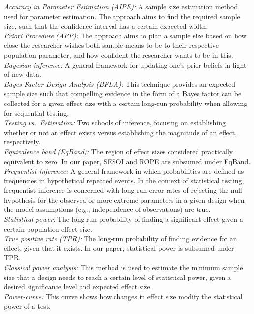 \documentclass[
  english,
  man,floatsintext]{apa6}
\begin{document}
\emph{Accuracy in Parameter Estimation (AIPE):} A sample size estimation method used for parameter estimation. The approach aims to find the required sample size, such that the confidence interval has a certain expected width.\\
\emph{Priori Procedure (APP):} The approach aims to plan a sample size based on how close the researcher wishes both sample means to be to their respective population parameter, and how confident the researcher wants to be in this.\\
\emph{Bayesian inference:} A general framework for updating one's prior beliefs in light of new data.\\
\emph{Bayes Factor Design Analysis (BFDA):} This technique provides an expected sample size such that compelling evidence in the form of a Bayes factor can be collected for a given effect size with a certain long-run probability when allowing for sequential testing.\\
\emph{Testing vs.~Estimation:} Two schools of inference, focusing on establishing whether or not an effect exists versus establishing the magnitude of an effect, respectively.\\
\emph{Equivalence band (EqBand):} The region of effect sizes considered practically equivalent to zero. In our paper, SESOI and ROPE are subsumed under EqBand.\\
\emph{Frequentist inference:} A general framework in which probabilities are defined as frequencies in hypothetical repeated events. In the context of statistical testing, frequentist inference is concerned with long-run error rates of rejecting the null hypothesis for the observed or more extreme parameters in a given design when the model assumptions (e.g., independence of observations) are true.\\
\emph{Statistical power:} The long-run probability of finding a significant effect given a certain population effect size.\\
\emph{True positive rate (TPR):} The long-run probability of finding evidence for an effect, given that it exists. In our paper, statistical power is subsumed under TPR.\\
\emph{Classical power analysis:} This method is used to estimate the minimum sample size that a design needs to reach a certain level of statistical power, given a desired significance level and expected effect size.\\
\emph{Power-curve:} This curve shows how changes in effect size modify the statistical power of a test.\\
\end{document}
